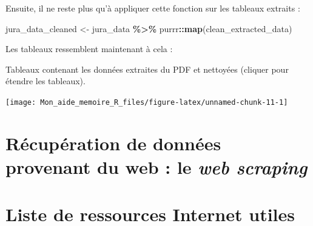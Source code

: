 \documentclass[
  french,
]{book}
\newenvironment{Shaded}{\begin{snugshade}}{\end{snugshade}}
\newcommand{\KeywordTok}[1]{\textcolor[rgb]{0.13,0.29,0.53}{\textbf{#1}}}
\newcommand{\NormalTok}[1]{#1}
\newcommand{\OperatorTok}[1]{\textcolor[rgb]{0.81,0.36,0.00}{\textbf{#1}}}
\newcommand{\StringTok}[1]{\textcolor[rgb]{0.31,0.60,0.02}{#1}}
\begin{document}
Ensuite, il ne reste plus qu'à appliquer cette fonction sur les tableaux
extraits :

\begin{Shaded}
\begin{Highlighting}[]
\NormalTok{jura\_data\_cleaned \textless{}{-}}\StringTok{ }\NormalTok{jura\_data }\OperatorTok{\%\textgreater{}\%}\StringTok{ }\NormalTok{purrr}\OperatorTok{::}\KeywordTok{map}\NormalTok{(clean\_extracted\_data)}
\end{Highlighting}
\end{Shaded}

Les tableaux ressemblent maintenant à cela :

\label{tab:juradatacleaned} Tableaux contenant les données extraites du PDF et nettoyées (cliquer pour étendre les tableaux).

\begin{center}\texttt{[image: Mon\_aide\_memoire\_R\_files/figure-latex/unnamed-chunk-11-1]} \end{center}

\hypertarget{ruxe9cupuxe9ration-de-donnuxe9es-provenant-du-web-le-web-scraping}{%
\section{\texorpdfstring{Récupération de données provenant du web : le \emph{web scraping}}{Récupération de données provenant du web : le web scraping}}\label{ruxe9cupuxe9ration-de-donnuxe9es-provenant-du-web-le-web-scraping}}

\hypertarget{ref-data-analysis}{%
\section*{Liste de ressources Internet utiles}\label{ref-data-analysis}}
\end{document}
